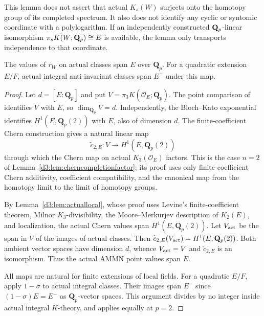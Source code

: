 \begin{remark}
This lemma does not assert that actual $K_s(W)$ surjects onto the
homotopy group of its completed spectrum. It also does not identify
any cyclic or syntomic coordinate with a polylogarithm. If an
independently constructed $\mathbf Q_p$-linear isomorphism
$\pi_sK(W;\mathbf Q_p)\cong E$ is available, the lemma only transports
independence to that coordinate.
\end{remark}

\begin{lemma}\label{d3:lem:directtcactualcoefficients}
The values of $r_W$ on actual classes span $E$ over $\mathbf Q_p$.
For a quadratic extension $E/F$, actual integral anti-invariant
classes span $E^{-}$ under this map.
\end{lemma}
\begin{proof}
Let $d=[E:\mathbf Q_p]$ and put
$V=\pi_3K(\mathcal O_E;\mathbf Q_p)$.
The point comparison of \cite[Proposition~4.10]{AMMN} identifies $V$ with $E$, so
$\dim_{\mathbf Q_p}V=d$. Independently, the Bloch--Kato exponential
identifies $H^1(E,\mathbf Q_p(2))$ with $E$, also of dimension $d$.
The finite-coefficient Chern construction gives a natural linear map
\[
 \widetilde c_{2,E}:V\longrightarrow H^1(E,\mathbf Q_p(2))
\]
through which the Chern map on actual $K_3(\mathcal O_E)$ factors.
This is the case $n=2$ of Lemma~\ref{d3:lem:cherncompletionfactor};
its proof uses only finite-coefficient Chern additivity,
coefficient compatibility, and the canonical map from the homotopy
limit to the limit of homotopy groups.

By Lemma~\ref{d3:lem:actuallocal}, whose proof uses Levine's
finite-coefficient theorem, Milnor $K_3$-divisibility, the
Moore--Merkurjev description of $K_2(E)$, and localization,
the actual Chern values span $H^1(E,\mathbf Q_p(2))$.
Let $V_{\rm act}$ be the span in $V$ of the images of actual classes.
Then $\widetilde c_{2,E}(V_{\rm act})=H^1(E,\mathbf Q_p(2))$.
Both ambient vector spaces have dimension $d$, whence
$V_{\rm act}=V$ and $\widetilde c_{2,E}$ is an isomorphism.
Thus the actual AMMN point values span $E$.

All maps are natural for finite extensions of local fields.
For a quadratic $E/F$, apply $1-\sigma$ to actual integral classes.
Their images span $E^-$ since $(1-\sigma)E=E^-$ as
$\mathbf Q_p$-vector spaces. This argument divides by no integer
inside actual integral $K$-theory, and applies equally at $p=2$.
\end{proof}

